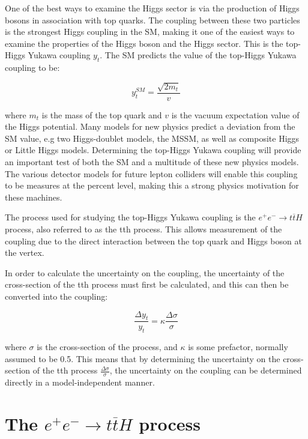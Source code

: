 One of the best ways to examine the Higgs sector is via the production of Higgs bosons in association with top quarks. The coupling between these two particles is the strongest Higgs coupling in the \acrshort{SM}, making it one of the easiest ways to examine the properties of the Higgs boson and the Higgs sector. This is the top-Higgs Yukawa coupling $y_t$. The \acrlong{SM} predicts the value of the top-Higgs Yukawa coupling to be:

\begin{equation}
	y_t^{SM} = \frac{\sqrt{2m_t}}{v}
\label{eq:yukawacoupling-sm-value}
\end{equation}

where $m_t$ is the mass of the top quark and $v$ is the vacuum expectation value of the Higgs potential. Many models for new physics predict a deviation from the \acrshort{SM} value, e.g two Higgs-doublet models, the \acrfull{MSSM}, as well as composite Higgs or Little Higgs models. Determining the top-Higgs Yukawa coupling will provide an important test of both the \acrlong{SM} and a multitude of these new physics models. The various detector models for future lepton colliders will enable this coupling to be measures at the percent level, making this a strong physics motivation for these machines.

The process used for studying the top-Higgs Yukawa coupling is the $e^+ e^- \rightarrow t\overline{t}H$ process, also referred to as the tth process. This allows measurement of the coupling due to the direct interaction between the top quark and Higgs boson at the vertex.

In order to calculate the uncertainty on the coupling, the uncertainty of the cross-section of the tth process must first be calculated, and this can then be converted into the coupling:

\begin{equation}
	\frac{\Delta y_t}{y_t} = \kappa \frac{\Delta \sigma}{\sigma}
\label{eq:crosssection-to-yukawa}
\end{equation}

where $\sigma$ is the cross-section of the process, and $\kappa$ is some prefactor, normally assumed to be 0.5. This means that by determining the uncertainty on the cross-section of the tth process $\frac{\Delta \sigma}{\sigma}$, the uncertainty on the coupling can be determined directly in a model-independent manner. 


\section{The $e^+ e^- \rightarrow t\overline{t}H$ process}

